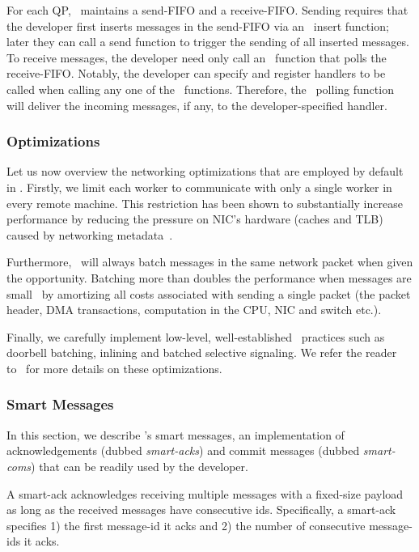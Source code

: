 For each QP, \odlib\ maintains a send-FIFO and a receive-FIFO.
Sending requires that the developer first inserts messages in the send-FIFO via an \odlib~insert function; later they can call a send function to trigger the sending of all inserted messages.
To receive messages, the developer need only call an \odlib~function that polls the receive-FIFO. 
Notably, the developer can specify and register handlers to be called when calling any one of the \odlib~functions. 
Therefore, the \odlib~polling function will deliver the incoming messages, if any, to the developer-specified handler.


\subsubsection{Optimizations} \label{sec:nw:opt}

Let us now overview the networking optimizations that are employed by default in \odlib.
Firstly, we limit each worker to communicate with only a single worker in every remote machine. 
This restriction has been shown to substantially increase performance by reducing the pressure on NIC's hardware (caches and TLB) caused by networking metadata~\cite{A&V:2018}.

Furthermore, \odlib\ will always batch messages in the same network packet when given the opportunity. Batching more than doubles the performance when messages are small~\cite{A&V:2018} by amortizing all costs associated with sending a single packet (\ie the packet header, DMA transactions, computation in the CPU, NIC and switch etc.).

Finally, we carefully implement low-level, well-established \RDMA~practices such as doorbell batching, inlining and batched selective signaling. We refer the reader to~\cite{Barak:2013, Kalia:2016} for more details on these optimizations.

\subsubsection{Smart Messages}\label{sec:nw:sm}

In this section, we describe \odlib's smart messages, \ie an implementation of acknowledgements (dubbed \emph{smart-acks}) and commit messages (dubbed \emph{smart-coms}) that can be readily used by the developer. 

A smart-ack acknowledges receiving multiple messages with a fixed-size payload as long as the received messages have consecutive ids.
Specifically, a smart-ack specifies 1) the first message-id it acks and 2) the number of consecutive message-ids it acks.

